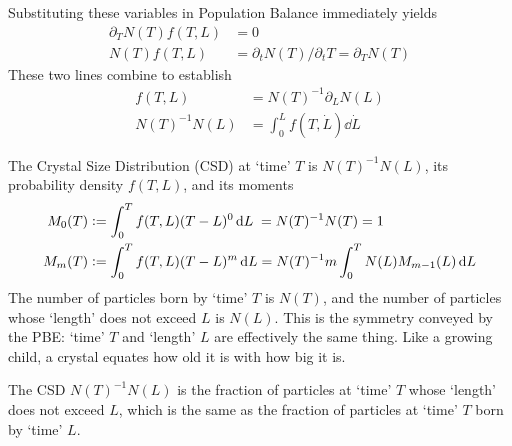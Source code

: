 \documentclass[a4paper]{base}
\begin{document}
    Substituting these variables in Population Balance  immediately yields
    \begin{equation} \label{sol:CSD:PBE}
        \begin{aligned}
            \partial_T N(T) f(T,L) &= 0 \\
            N(T) f(T, L) &= \partial_{t} N(T)/ \partial_{t} T = \partial_T N(T)
        \end{aligned}
    \end{equation}
    These two lines combine to establish
    \begin{equation} \label{sol:CSD:N}
        \begin{aligned}
            f(T, L) &= N(T)^{-1} \partial_L N(L) \\
            N(T)^{-1} N(L)  &= \int_{0}^{L} f(T, \dot{L}) \dd{\dot{L}}
        \end{aligned}
    \end{equation}

    The Crystal Size Distribution (CSD) at `time' $T$ is $N(T)^{-1} N(L)$, its probability density $f(T, L)$, and its moments
    \begin{equation} \label{def:CSD:M}
        \begin{aligned}
             M_0(T) &\mathrel{\mathop:}= \int_{0}^{T} f(T, L)(T-L)^{0} \,\mathrm{d}L \;= N(T)^{-1}N(T) = 1 \\
             M_m(T) &\mathrel{\mathop:}= \int_{0}^{T} f(T, L)(T-L)^{m} \,\mathrm{d}L = N(T)^{-1} m \int_{0}^{T} N(L)M_{m-1}(L) \,\mathrm{d}L
        \end{aligned}
    \end{equation}
    The number of particles born by `time' $T$ is $N(T)$, and the number of particles whose `length' does not exceed $L$ is $N(L)$.
    This is the symmetry conveyed by the PBE: `time' $T$ and `length' $L$ are effectively the same thing.
    Like a growing child, a crystal equates how old it is with how big it is.

    The CSD $N(T)^{-1} N(L)$ is the fraction of particles at `time' $T$ whose `length' does not exceed $L$, which is the same as the fraction of particles at `time' $T$ born by `time' $L$.
\end{document}
